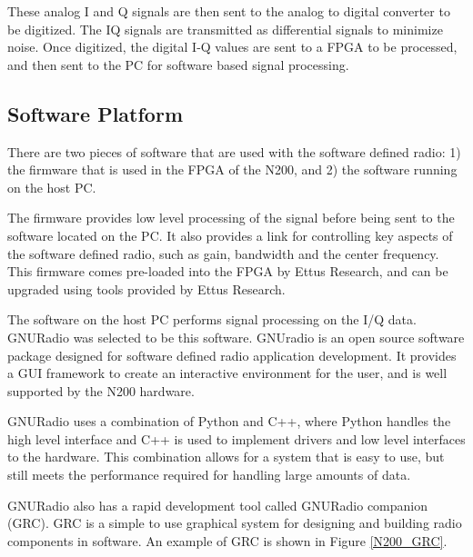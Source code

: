 These analog I and Q signals are then sent to the analog to digital converter to be digitized.  The IQ signals are transmitted as differential signals to minimize noise.  Once digitized, the digital I-Q values are sent to a FPGA to be processed, and then sent to the PC for software based signal processing.

\subsection{Software Platform} \label{software_platform}

There are two pieces of software that are used with the software defined radio:  1) the firmware that is used in the FPGA of the N200, and 2) the software running on the host PC.  

The firmware provides low level processing of the signal before being sent to the software located on the PC.  It also provides a link for controlling key aspects of the software defined radio, such as gain, bandwidth and the center frequency.  This firmware comes pre-loaded into the FPGA by Ettus Research, and can be upgraded using tools provided by Ettus Research.

The software on the host PC performs signal processing on the I/Q data.  GNURadio was selected to be this software.   GNUradio is an open source software package designed for software defined radio application development.  It provides a GUI framework to create an interactive environment for the user, and is well supported by the N200 hardware.  

GNURadio uses a combination of Python and C++, where Python handles the high level interface and C++ is used to implement drivers and low level interfaces to the hardware.  This combination allows for a system that is easy to use, but still meets the performance required for handling large amounts of data. 

GNURadio also has a rapid development tool called GNURadio companion (GRC).  GRC is a simple to use graphical system for designing and building radio components in software. An example of GRC is shown in Figure \ref{N200_GRC}.

